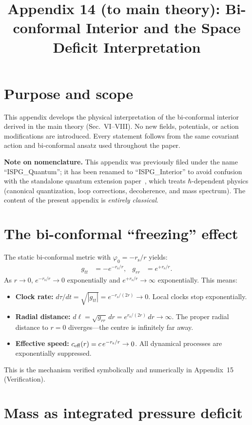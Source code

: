\documentclass[11pt]{article}
\title{Appendix 14 (to main theory): Bi-conformal Interior and the Space Deficit Interpretation}
\author{}
\date{}
\newcommand{\rs}{r_{\mathrm{s}}}
\begin{document}
\let\phi\varphi
\maketitle

\section*{Purpose and scope}
This appendix develops the physical interpretation of the bi-conformal interior derived in the main theory (Sec.~VI--VIII). No new fields, potentials, or action modifications are introduced. Every statement follows from the same covariant action and bi-conformal ansatz used throughout the paper.

\textbf{Note on nomenclature.}  This appendix was
previously filed under the name ``ISPG\_Quantum''; it has
been renamed to ``ISPG\_Interior'' to avoid confusion with
the standalone quantum extension paper~\cite{Lotishvili2026Q},
which treats $\hbar$-dependent physics (canonical
quantization, loop corrections, decoherence, and mass
spectrum).  The content of the present appendix is
\emph{entirely classical}.

\section{The bi-conformal ``freezing'' effect}\label{sec:freezing}

The static bi-conformal metric with $\phi_0 = -\rs/r$ yields:
\begin{align}
g_{tt} &= -e^{-\rs/r}, &
g_{rr} &= e^{+\rs/r}.
\end{align}
As $r \to 0$, $e^{-\rs/r} \to 0$ exponentially and $e^{+\rs/r} \to \infty$ exponentially. This means:
\begin{itemize}
\item \textbf{Clock rate:} $d\tau/dt = \sqrt{|g_{tt}|} = e^{-\rs/(2r)} \to 0$. Local clocks stop exponentially.
\item \textbf{Radial distance:} $d\ell = \sqrt{g_{rr}}\,dr = e^{\rs/(2r)}\,dr \to \infty$. The proper radial distance to $r=0$ diverges---the centre is infinitely far away.
\item \textbf{Effective speed:} $c_{\rm eff}(r) = c\,e^{-\rs/r} \to 0$. All dynamical processes are exponentially suppressed.
\end{itemize}
This is the mechanism verified symbolically and numerically in Appendix~15 (Verification).

\section{Mass as integrated pressure deficit}\label{sec:mass}
\end{document}

